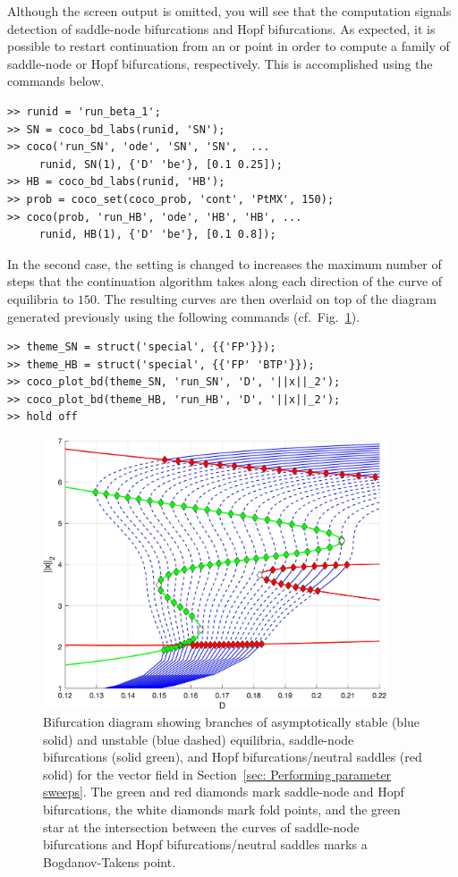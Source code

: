 Although the screen output is omitted, you will see that the computation signals detection of saddle-node bifurcations and Hopf bifurcations. As expected, it is possible to restart continuation from an  or  point in order to compute a family of saddle-node or Hopf bifurcations, respectively. This is accomplished using the commands below.
\begin{lstlisting}[language=coco-highlight,frame=lines]
>> runid = 'run_beta_1';
>> SN = coco_bd_labs(runid, 'SN');
>> coco('run_SN', 'ode', 'SN', 'SN',  ...
     runid, SN(1), {'D' 'be'}, [0.1 0.25]);
>> HB = coco_bd_labs(runid, 'HB');
>> prob = coco_set(coco_prob, 'cont', 'PtMX', 150);
>> coco(prob, 'run_HB', 'ode', 'HB', 'HB', ...
     runid, HB(1), {'D' 'be'}, [0.1 0.8]);
\end{lstlisting}
In the second case, the  setting is changed to increases the maximum number of steps that the continuation algorithm takes along each direction of the curve of equilibria to $150$. The resulting curves are then overlaid on top of the diagram generated previously using the following commands (cf.\ Fig.~\ref{fig: Section3_5_2}).
\begin{lstlisting}[language=coco-highlight,frame=lines]
>> theme_SN = struct('special', {{'FP'}});
>> theme_HB = struct('special', {{'FP' 'BTP'}});
>> coco_plot_bd(theme_SN, 'run_SN', 'D', '||x||_2');
>> coco_plot_bd(theme_HB, 'run_HB', 'D', '||x||_2');
>> hold off
\end{lstlisting}
\begin{figure}[h]
\centering
\includegraphics[width=4in]{Figures/Section3_5_2.jpg}
\caption{Bifurcation diagram showing branches of asymptotically stable (blue solid) and unstable (blue dashed) equilibria, saddle-node bifurcations (solid green), and Hopf bifurcations/neutral saddles (red solid) for the vector field in Section~\ref{sec: Performing parameter sweeps}. The green and red diamonds mark saddle-node and Hopf bifurcations, the white diamonds mark fold points, and the green star at the intersection between the curves of saddle-node bifurcations and Hopf bifurcations/neutral saddles marks a Bogdanov-Takens point.}
\label{fig: Section3_5_2}
\end{figure}
